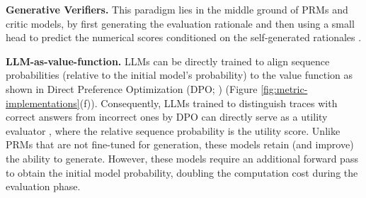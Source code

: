 
\textbf{Generative Verifiers.} This paradigm lies in the middle ground of PRMs and critic models, by first generating the evaluation rationale and then using a small head to predict the numerical scores conditioned on the self-generated rationales \citep{ankner2024critiqueoutloudrewardmodels, zhang2024generativeverifiersrewardmodeling}.

\textbf{LLM-as-value-function.} LLMs can be directly trained to align sequence probabilities (relative to the initial model's probability) to the value function as shown in Direct Preference Optimization (DPO; \citet{NEURIPS2023_a85b405e}) (Figure \ref{fig:metric-implementations}(f)). Consequently, LLMs trained to distinguish traces with correct answers from incorrect ones by DPO can directly serve as a utility evaluator \citep{mahan2024generativerewardmodels, lai2024stepdpostepwisepreferenceoptimization, xie2024montecarlotreesearch, pang2024iterativereasoningpreferenceoptimization, cui2025processreinforcementimplicitrewards}, where the relative sequence probability is the utility score. Unlike PRMs that are not fine-tuned for generation, these models retain (and improve) the ability to generate. However, these models require an additional forward pass to obtain the initial model probability, doubling the computation cost during the evaluation phase.
